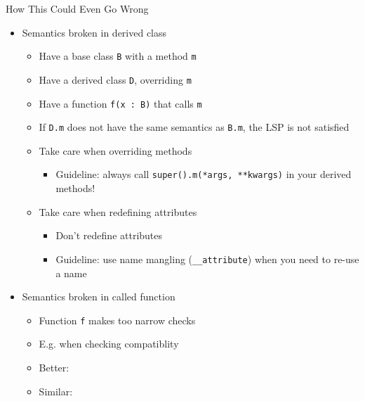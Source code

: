 \begin{frame}{How This Could Even Go Wrong}
%
\begin{itemize}
\item Semantics broken in derived class
	\begin{itemize}
	\item Have a base class \texttt{B} with a method \texttt{m}
	\item Have a derived class \texttt{D}, overriding \texttt{m}
	\item Have a function \texttt{f(x : B)} that calls \texttt{m}
	\item If \texttt{D.m} does not have the same semantics as \texttt{B.m}, the LSP is not satisfied
	\item[\Thus] Take care when overriding methods
		\begin{itemize}
		\item Guideline: always call \texttt{super().m(*args, **kwargs)} in your derived methods!
		\end{itemize}
	\item[\Thus] Take care when redefining attributes
		\begin{itemize}
		\item Don't redefine attributes
		\item Guideline: use name mangling (\texttt{\_\_attribute}) when you need to re-use a name
		\end{itemize}
	\end{itemize}
	\pause
\item Semantics broken in called function
	\begin{itemize}
	\item Function \texttt{f} makes too narrow checks
	\item E.\;g.  when checking compatiblity
	\item Better:  
	\item Similar:  
	\end{itemize}
\end{itemize}
%
\end{frame}


